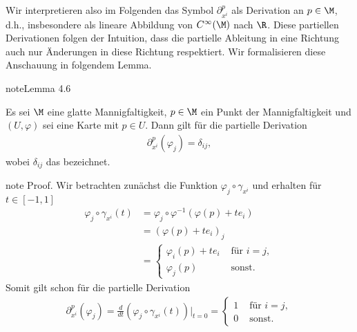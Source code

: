 \documentclass[letterpaper,10pt,german]{jupyterBook}
\begin{document}
\sphinxAtStartPar
Wir interpretieren also im Folgenden das Symbol \(\partial_{x^{i}}^p\) als Derivation an \(p\in\M\), d.h., insbesondere als lineare Abbildung von \(C^\infty(\M)\) nach \(\R\).
Diese partiellen Derivationen folgen der Intuition, dass die partielle Ableitung in eine Richtung auch nur Änderungen in diese Richtung respektiert.
Wir formalisieren diese Anschauung in folgendem Lemma.
\label{manifolds/tangential:lem:partderkron}
\begin{sphinxadmonition}{note}{Lemma 4.6}



\sphinxAtStartPar
Es sei \(\M\) eine glatte Mannigfaltigkeit, \(p\in\M\) ein Punkt der Mannigfaltigkeit und \((U,\varphi)\) sei eine Karte mit \(p\in U\).
Dann gilt für die partielle Derivation
\begin{equation*}
\begin{split}\partial_{x^i}^p(\varphi_j) = \delta_{ij},\end{split}
\end{equation*}
\sphinxAtStartPar
wobei \(\delta_{ij}\) das  bezeichnet.
\end{sphinxadmonition}

\begin{sphinxadmonition}{note}
\sphinxAtStartPar
Proof. Wir betrachten zunächst die Funktion \(\varphi_j \circ \gamma_{x^i}\) und erhalten für \(t\in [-1,1]\)
\begin{equation*}
\begin{split}\varphi_j \circ \gamma_{x^i}(t)
&= \varphi_j \circ \varphi^{-1}(\varphi(p) + t e_i)\\
&= (\varphi(p) + t e_i)_j\\ 
&=
\begin{cases}
\varphi_i(p) + t e_i &\text{ für } i=j,\\
\varphi_j(p)&\text{ sonst}.
\end{cases}\end{split}
\end{equation*}
\sphinxAtStartPar
Somit gilt schon für die partielle Derivation
\begin{equation*}
\begin{split}\partial_{x^i}^p(\varphi_j)=
\frac{d}{dt} (\varphi_j \circ \gamma_{x^i}(t))\big\rvert_{t=0} = 
\begin{cases}
1&\text{ für } i=j,\\
0&\text{ sonst}.
\end{cases}\end{split}
\end{equation*}\end{sphinxadmonition}
\end{document}
